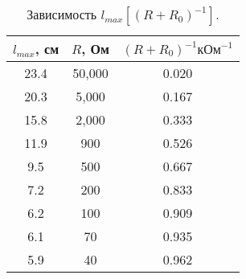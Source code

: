 \begin{table} 
\begin{center}
 \caption{Зависимость $l_{max}\left[ (R + R_0)^{-1} \right]$.}
 \label{table3}
\begin{tabular}{|*{3}{c|}}
\hline 
$l_{max}$, см & $R$, Ом & $(R + R_0)^{-1} \text{кОм}^{-1}$\\ \hline 
23.4 & 50,000 & 0.020 \\ \hline 
 20.3 & 5,000 & 0.167 \\ \hline 
 15.8 & 2,000 & 0.333 \\ \hline 
 11.9 & 900 & 0.526 \\ \hline 
 9.5 & 500 & 0.667 \\ \hline 
 7.2 & 200 & 0.833 \\ \hline 
 6.2 & 100 & 0.909 \\ \hline 
 6.1 & 70 & 0.935 \\ \hline 
 5.9 & 40 & 0.962 \\ \hline 
 \end{tabular}
 \end{center} 
\end{table} 
